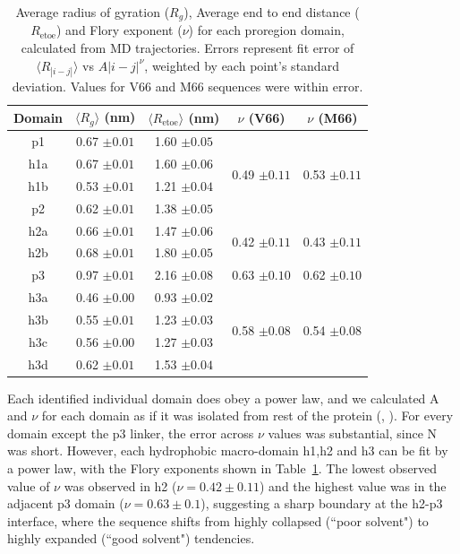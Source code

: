 \documentclass[10pt,letterpaper]{article}
\begin{document}
\begin{table}[!ht]
\centering
\caption{Average radius of gyration ($R_g$), Average end to end distance ($R_{\mathrm{etoe}}$) and Flory exponent ($\nu$) for each proregion domain, calculated from MD trajectories. Errors represent fit error of $\langle R_{|i-j|}\rangle$ vs $A|i-j|^{\nu}$, weighted by each point's standard deviation. Values for V66 and M66 sequences were within error.}
\label{table2}
\begin{tabular}{|c|c|c|c|c|}  
\hline 
Domain & $\langle R_g \rangle $ (nm)  & $\langle R_{\mathrm{etoe}} \rangle$ (nm)  & $\nu$ (V66) & $\nu$ (M66)  \\
\hline
p1 & 0.67 $\pm{0.01}$ & 1.60 $\pm{0.05}$ & &\\
\hline
h1a & 0.67 $\pm{0.01}$ & 1.60 $\pm{0.06}$ &  \multirow{2}{*}{0.49  $\pm{0.11}$} &  \multirow{2}{*}{0.53  $\pm{0.11}$} \\ \cline{1-3}
h1b & 0.53 $\pm{0.01}$ & 1.21 $\pm{0.04}$  & &\\
\hline
p2 & 0.62 $\pm{0.01}$ & 1.38 $\pm{0.05}$ & &\\
\hline 
h2a & 0.66 $\pm{0.01}$ & 1.47 $\pm{0.06}$ & \multirow{2}{*}{0.42 $\pm{0.11}$} & \multirow{2}{*}{0.43  $\pm{0.11}$}\\  \cline{1-3}

h2b & 0.68 $\pm{0.01}$ & 1.80 $\pm{0.05}$ & &\\ 
\hline
p3 & 0.97 $\pm{0.01}$ & 2.16 $\pm{0.08}$  & 0.63  $\pm{0.10}$ &  0.62   $\pm{0.10}$\\
\hline
h3a & 0.46 $\pm{0.00}$ & 0.93 $\pm{0.02}$ & \multirow{4}{*}{0.58 $\pm{0.08}$} & \multirow{4}{*}{0.54   $\pm{0.08}$}\\ \cline{1-3}

h3b & 0.55 $\pm{0.01}$ & 1.23 $\pm{0.03}$ & &\\ 

h3c & 0.56 $\pm{0.00}$ & 1.27 $\pm{0.03}$ & & \\ 

h3d & 0.62 $\pm{0.01}$ & 1.53 $\pm{0.04}$ & &\\
\hline
\end{tabular}
\end{table}

Each identified individual domain does obey a power law, and we calculated A and $\nu$ for each domain as if it was isolated from rest of the protein (, ). For every domain except the p3 linker, the error across $\nu$ values was substantial, since N was short. However, each hydrophobic macro-domain h1,h2 and h3 can be fit by a power law, with the Flory exponents shown in Table~\ref{table2}. The lowest observed value of $\nu$ was observed in h2 ($\nu = 0.42 \pm 0.11$) and the highest value was in the adjacent p3 domain ($\nu = 0.63 \pm 0.1$), suggesting a sharp boundary at the h2-p3 interface, where the sequence shifts from highly collapsed (``poor solvent") to highly expanded (``good solvent") tendencies.
\end{document}
